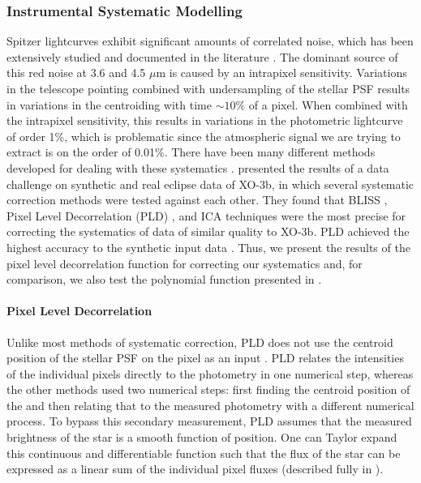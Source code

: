 \subsubsection{Instrumental Systematic Modelling}
\label{P1:subsec:systematics}

Spitzer lightcurves exhibit significant amounts of correlated noise, which has been extensively studied and documented in the literature \citep{Charbonneau2005, Agol2010, Seager2010, Stevenson2010b}. The dominant source of this red noise at 3.6 and 4.5 $\mu$m is caused by an intrapixel sensitivity. Variations in the telescope pointing combined with undersampling of the stellar PSF results in variations in the centroiding with time $\sim10\%$ of a pixel. When combined with the intrapixel sensitivity, this results in variations in the photometric lightcurve of order 1\%, which is problematic since the atmospheric signal we are trying to extract is on the order of 0.01\%. There have been many different methods developed for dealing with these systematics \citep[e.g.,][]{Reach2005, Charbonneau2008, Ballard2010, Stevenson2012, Gibson2012, Morello2015a, Morello2015b, Deming2015}. \citet{Ingalls2016} presented the results of a data challenge on synthetic and real eclipse data of XO-3b, in which several systematic correction methods were tested against each other. They found that BLISS \citep{Stevenson2012}, Pixel Level Decorrelation (PLD) \citep{Deming2015}, and ICA techniques \citep{Morello2015a} were the most precise for correcting the systematics of data of similar quality to XO-3b. PLD achieved the highest accuracy to the synthetic input data \citep{Deming2015}. Thus, we present the results of the pixel level decorrelation function for correcting our systematics and, for comparison, we also test the polynomial function presented in \citet{Knutson2008}.


\paragraph{Pixel Level Decorrelation}

Unlike most methods of systematic correction, PLD does not use the centroid position of the stellar PSF on the pixel as an input \citep{Deming2015}. PLD relates the intensities of the individual pixels directly to the photometry in one numerical step, whereas the other methods used two numerical steps: first finding the centroid position of the and then relating that to the measured photometry with a different numerical process. To bypass this secondary measurement, PLD assumes that the measured brightness of the star is a smooth function of position. One can Taylor expand this continuous and differentiable function such that the flux of the star can be expressed as a linear sum of the individual pixel fluxes (described fully in \citet{Deming2015}).

